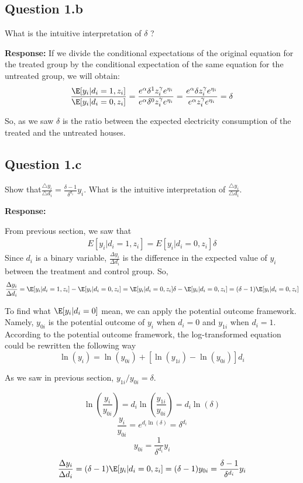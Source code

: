 \documentclass{article}
\begin{document}
\subsection*{Question 1.b} What is the intuitive interpretation of \(\delta\) ? 

\textbf{Response:} 
If we divide the conditional expectations of the original equation for the treated group by the conditional expectation of the same equation for the untreated group, we will obtain: 
       \begin{align}
       \frac{\E[y_i|d_i=1,z_i]}{\E[y_i|d_i=0,z_i]} = \frac{e^\alpha\delta^1 z_i^{\gamma}e^{\eta_i}}{e^\alpha \delta^0 z_i^{\gamma}e^{\eta_i}} = \frac{e^\alpha\delta z_i^{\gamma}e^{\eta_i}}{e^\alpha z_i^{\gamma}e^{\eta_i}} = \delta
    \end{align}
           
So, as we saw \(\delta\) is the ratio between the expected electricity consumption of the treated and the untreated houses.

\subsection*{Question 1.c} Show that\(\frac{\triangle y_i}{\triangle d_i} = \frac{\delta -1}{\delta^{d_i}} y_i \). What is the intuitive interpretation of \(\frac{\triangle y_i}{\triangle d_i} \).

\textbf{Response:} 

From previous section, we saw that 
\begin{align}
       E[y_i|d_i=1,z_i] = E[y_i|d_i=0,z_i]\delta 
    \end{align}
Since \(d_i\) is a binary variable, \(\frac{\Delta y_i}{\Delta d_i}\) is the difference in the expected value of \(y_i\) between the treatment and control group. So, \[  \frac{\Delta y_i}{\Delta d_i}=\E[y_i|d_i=1,z_i]-\E[y_i|d_i=0,z_i] = \E[y_i|d_i=0,z_i]\delta-\E[y_i|d_i=0,z_i] = (\delta - 1) \E[y_i|d_i=0,z_i] \]
 
To find what \(\E[y_i|d_i=0]\) mean, we can apply the potential outcome framework. Namely, \(y_{0i}\) is the potential outcome of \(y_{i}\) when  \(d_i=0\) and \(y_{1i}\) when \(d_i=1\). According to the potential outcome framework, the log-transformed equation could be rewritten the following way
    \[\ln(y_i)=\ln(y_{0i})+[\ln(y_{1i})-\ln(y_{0i})]d_i \]  

As we saw in previous section, \(y_{1i}/y_{0i}=\delta\).

       \[ \ln (\frac{y_i}{y_{0i}})=d_i\ln(\frac{y_{1i}}{y_{0i}})=d_i\ln(\delta) \]  
        \[ \frac{y_i}{y_{0i}}=e^{d_i\ln(\delta)}=\delta^{d_i} \]  
         \[  y_{0i}=\frac{1}{\delta^{d_i}}y_i \] 
          \[ \frac{\Delta y_i}{\Delta d_i}=(\delta - 1) \E[y_i|d_i=0,z_i]= (\delta - 1) y_{0i} = \frac{\delta-1}{\delta^{d_i}}y_i\]
\end{document}
